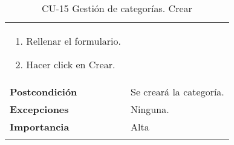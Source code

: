 \begin{longtable}[H]{@{}ll@{}}
\begin{minipage}[t]{0.71\columnwidth}
\begin{enumerate}
\item
Rellenar el formulario.
\item
Hacer click en Crear.
\end{enumerate}\strut
\end{minipage}\tabularnewline
\begin{minipage}[t]{0.23\columnwidth}\raggedright\strut
\textbf{Postcondición}\strut
\end{minipage} & \begin{minipage}[t]{0.71\columnwidth}\raggedright\strut
Se creará la categoría.\strut
\end{minipage}\tabularnewline
\begin{minipage}[t]{0.23\columnwidth}\raggedright\strut
\textbf{Excepciones}\strut
\end{minipage} & \begin{minipage}[t]{0.71\columnwidth}\raggedright\strut
Ninguna. \strut
\end{minipage}\tabularnewline
\begin{minipage}[t]{0.23\columnwidth}\raggedright\strut
\textbf{Importancia}\strut
\end{minipage} & \begin{minipage}[t]{0.71\columnwidth}\raggedright\strut
Alta\strut
\end{minipage}\tabularnewline
\bottomrule
\caption{CU-15 Gestión de categorías. Crear}
\end{longtable}

